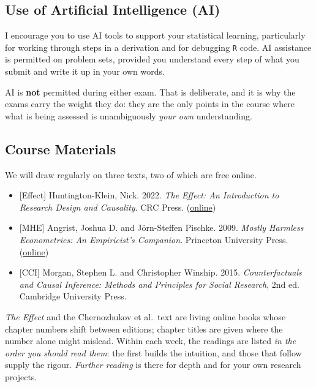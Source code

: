 \documentclass[12pt]{article}
\begin{document}
\subsection*{Use of Artificial Intelligence (AI)}
I encourage you to use AI tools to support your statistical learning, particularly for working through steps in a derivation and for debugging \texttt{R} code. AI assistance is permitted on problem sets, provided you understand every step of what you submit and write it up in your own words.

\vspace{0.5em}

\noindent AI is \textbf{not} permitted during either exam. That is deliberate, and it is why the exams carry the weight they do: they are the only points in the course where what is being assessed is unambiguously \emph{your own} understanding.

\subsection*{Course Materials}

We will draw regularly on three texts, two of which are free online.
\begin{itemize}[noitemsep, topsep=2pt]
    \item \textcolor{titlecolor}{[Effect]} Huntington-Klein, Nick. 2022. \textit{The Effect: An Introduction to Research Design and Causality}. CRC Press. (\href{https://theeffectbook.net/}{online})
    \item \textcolor{titlecolor}{[MHE]} Angrist, Joshua D. and J\"orn-Steffen Pischke. 2009. \textit{Mostly Harmless Econometrics: An Empiricist's Companion}. Princeton University Press. (\href{https://www.dsecoaching.com/pdf/2008\%20Angrist\%20Pischke\%20MostlyHarmlessEconometrics.pdf}{online})
    \item \textcolor{titlecolor}{[CCI]} Morgan, Stephen L. and Christopher Winship. 2015. \textit{Counterfactuals and Causal Inference: Methods and Principles for Social Research}, 2nd ed. Cambridge University Press.
\end{itemize}

\noindent \textit{The Effect} and the Chernozhukov et al.\ text are living online
books whose chapter numbers shift between editions; chapter titles are given
where the number alone might mislead. Within each week, the readings are listed
\textit{in the order you should read them}: the first builds the intuition, and those that follow supply the rigour. \textit{Further reading} is there for depth and for your own research projects.
\end{document}
